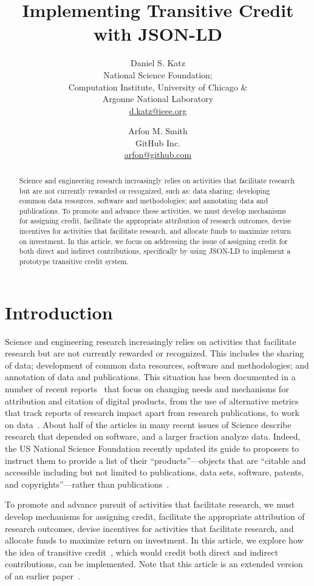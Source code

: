 \documentclass[a4paper,10pt]{article}
\title{Implementing Transitive Credit with JSON-LD \vspace{-0.2cm}}
\author{
Daniel S. Katz\\
National Science Foundation;\\
Computation Institute, University of Chicago \&\\
Argonne National Laboratory\\
\url{d.katz@ieee.org}
\and
Arfon M. Smith\\
GitHub Inc.\\
\url{arfon@github.com}
}
\date{}
\begin{document}
\maketitle

\vspace{-1.2cm}
\begin{abstract}

\noindent
Science and engineering research increasingly relies on activities that facilitate research but are not currently rewarded or recognized, such as: data sharing; developing common data resources, software and methodologies; and annotating data and publications.   
To promote and advance these activities, we must develop mechanisms for assigning credit, facilitate the appropriate attribution of research outcomes, devise incentives for activities that facilitate research, and allocate funds to maximize return on investment. In this article, we focus on addressing the issue of assigning credit for both direct and indirect contributions, specifically by using JSON-LD to implement a prototype transitive credit system.
\end{abstract}

\section{Introduction}

Science and engineering research increasingly relies on activities that facilitate research but are not currently rewarded or recognized. This includes the sharing of data; development of common data resources, software and methodologies; and annotation of data and publications. This situation has been documented in a number of recent reports~\cite{NSF_software_vision, WSSSPE1} that focus on changing needs and mechanisms for attribution and citation of digital products, from the use of alternative metrics~\cite{altmetrics} that track reports of research impact apart from research publications, to work on data~\cite{nrc_data}. About half of the articles in many recent issues of Science describe research that depended on software, and a larger fraction analyze data. Indeed, the US National Science Foundation recently updated its guide to proposers to instruct them to provide a list of their ``products''---objects that are ``citable and accessible including but not limited to publications, data sets, software, patents, and copyrights''---rather than publications~\cite{nsf_gpg}.  

To promote and advance pursuit of activities that facilitate research, we must develop mechanisms for assigning credit, facilitate the appropriate attribution of research outcomes, devise incentives for activities that facilitate research, and allocate funds to maximize return on investment. In this article, we explore how the idea of transitive credit~\cite{Katz2_WSSSPE, Katz2_WSSSPE_JORS}, which would credit both direct and indirect contributions, can be implemented. Note that this article is an extended version of an earlier paper~\cite{transitive-wssspe2}. 
\end{document}

